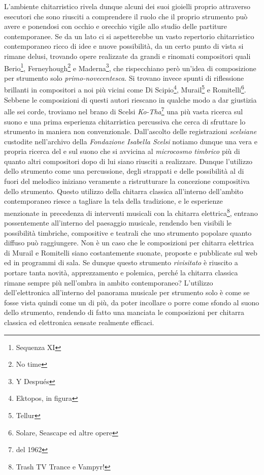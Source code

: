 \documentclass[oneside]{article}
\begin{document}
\begin{multicols*}{2}
L'ambiente chitarristico rivela dunque alcuni dei suoi gioielli proprio attraverso esecutori che sono riusciti a comprendere il ruolo che il proprio strumento può avere e ponendosi con occhio e orecchio vigile allo studio delle partiture contemporanee. Se da un lato ci si aspetterebbe un vasto repertorio chitarristico contemporaneo ricco di idee e nuove possibilità, da un certo punto di vista si rimane delusi, trovando opere realizzate da grandi e rinomati compositori quali Berio\footnote{Sequenza XI}, Ferneyhough\footnote{No time} e Maderna\footnote{Y Después}, che rispecchiano però un'idea di composizione per strumento solo \textit{primo-novecentesca}. Si trovano invece spunti di riflessione brillanti in compositori a noi più vicini come Di Scipio\footnote{Ektopos, in figura}, Murail\footnote{Tellur} e Romitelli\footnote{Solare, Seascape ed altre opere}. Sebbene le composizioni di questi autori riescano in qualche modo a dar giustizia alle sei corde, troviamo nel brano di Scelsi \textit{Ko-Tha}\footnote{del 1962} una più vasta ricerca sul suono e una prima esperienza chitarristica percussiva che cerca di sfruttare lo strumento in maniera non convenzionale. Dall'ascolto delle registrazioni \textit{scelsiane} custodite nell'archivo della \textit{Fondazione Isabella Scelsi} notiamo dunque una vera e propria ricerca del e sul suono che si avvicina al \textit{microcosmo timbrico} più di quanto altri compositori dopo di lui siano riusciti a realizzare. Dunque l'utilizzo dello strumento come una percussione, degli strappati e delle possibilità al di fuori del melodico iniziano veramente a ristrutturare la concezione compositiva dello strumento. %
Questo utilizzo della chitarra classica all'interno dell'ambito contemporaneo riesce a tagliare la tela della tradizione, e le esperienze menzionate in precedenza di interventi musicali con la chitarra elettrica\footnote{Trash TV Trance e Vampyr!}, entrano possentemente all'interno del paesaggio musicale, rendendo ben visibili le possibilità timbriche, compositive e teatrali che uno strumento popolare quanto diffuso può raggiungere. Non è un caso che le composizioni per chitarra elettrica di Murail e Romitelli siano costantemente suonate, proposte e pubblicate sul web ed in programmi di sala. 
Se dunque questo strumento \textit{rivisitato} è riuscito a portare tanta novità, apprezzamento e polemica, perché la chitarra classica rimane sempre più nell'ombra in ambito contemporaneo?
L'utilizzo dell'elettronica all'interno del panorama musicale per strumento solo è come se fosse vista quindi come un di più, da poter incollare o porre come sfondo al suono dello strumento, rendendo di fatto una manciata le composizioni per chitarra classica ed elettronica sensate realmente efficaci.


\end{multicols*}
\end{document}
